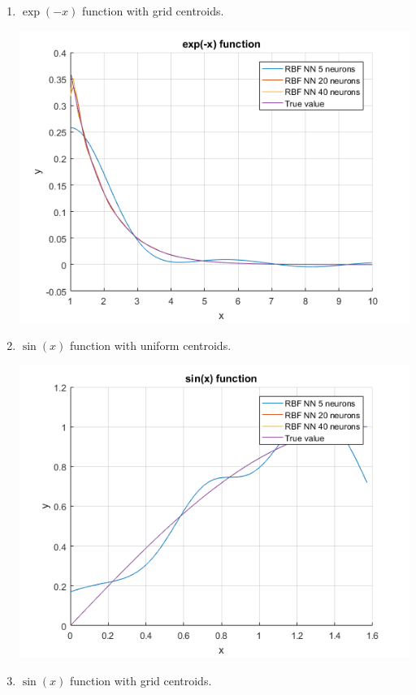 \documentclass[a4paper, 12pt]{article}
\begin{document}
\begin{enumerate}
\item $\exp(-x)$ function with grid centroids.

\includegraphics[scale = 0.8]{f3.png}
\newpage
\item $\sin(x)$ function with uniform centroids.

\includegraphics[scale = 0.8]{f44.png}

\item $\sin(x)$ function with grid centroids.


\end{enumerate}
\end{document}
